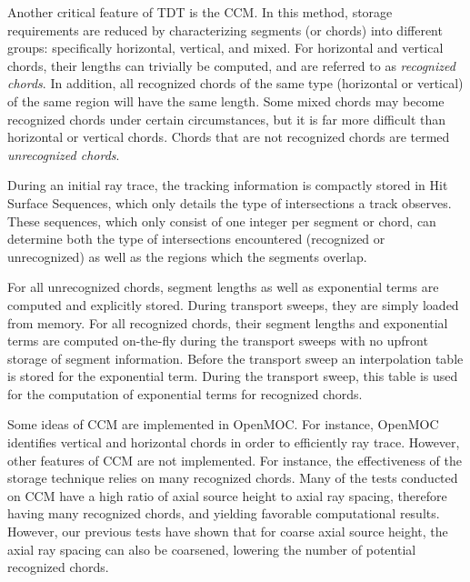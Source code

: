 Another critical feature of TDT is the \ac{CCM}. In this method, storage requirements are reduced by characterizing segments (or chords) into different groups: specifically horizontal, vertical, and mixed. For horizontal and vertical chords, their lengths can trivially be computed, and are referred to as \textit{recognized chords}. In addition, all recognized chords of the same type (horizontal or vertical) of the same region will have the same length. Some mixed chords may become recognized chords under certain circumstances, but it is far more difficult than horizontal or vertical chords. Chords that are not recognized chords are termed \textit{unrecognized chords}.

During an initial ray trace, the tracking information is compactly stored in Hit Surface Sequences, which only details the type of intersections a track observes. These sequences, which only consist of one integer per segment or chord, can determine both the type of intersections encountered (recognized or unrecognized) as well as the regions which the segments overlap.

For all unrecognized chords, segment lengths as well as exponential terms are computed and explicitly stored. During transport sweeps, they are simply loaded from memory. For all recognized chords, their segment lengths and exponential terms are computed on-the-fly during the transport sweeps with no upfront storage of segment information. Before the transport sweep an interpolation table is stored for the exponential term. During the transport sweep, this table is used for the computation of exponential terms for recognized chords. 

Some ideas of \ac{CCM} are implemented in OpenMOC. For instance, OpenMOC identifies vertical and horizontal chords in order to efficiently ray trace. However, other features of \ac{CCM} are not implemented. For instance, the effectiveness of the storage technique relies on many recognized chords. Many of the tests conducted on \ac{CCM} have a high ratio of axial source height to axial ray spacing, therefore having many recognized chords, and yielding favorable computational results. However, our previous tests have shown that for coarse axial source height, the axial ray spacing can also be coarsened, lowering the number of potential recognized chords.



